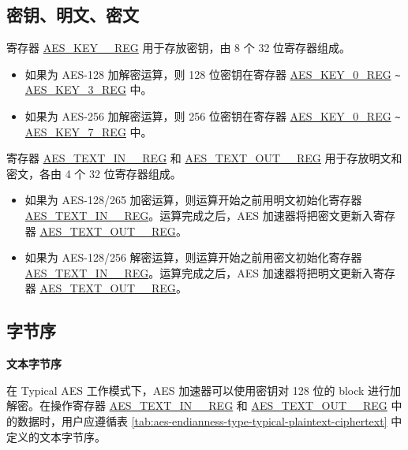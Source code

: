 \documentclass[main\_\_CN.tex]{subfiles}
\begin{document}
\subsection{密钥、明文、密文}

寄存器 \hyperref[regdesc:AESKEYnREG]{AES\_KEY\_\_REG} 用于存放密钥，由 8 个 32 位寄存器组成。

\begin{itemize}
    \item 如果为 AES-128 加解密运算，则 128 位密钥在寄存器 \hyperref[regdesc:AESKEYnREG]{AES\_KEY\_0\_REG} \verb+~+ \hyperref[regdesc:AESKEYnREG]{AES\_KEY\_3\_REG} 中。
    \item 如果为 AES-256 加解密运算，则 256 位密钥在寄存器 \hyperref[regdesc:AESKEYnREG]{AES\_KEY\_0\_REG} \verb+~+ \hyperref[regdesc:AESKEYnREG]{AES\_KEY\_7\_REG} 中。
\end{itemize}

寄存器 \hyperref[regdesc:AESTEXTINnREG]{AES\_TEXT\_IN\_\_REG} 和 \hyperref[regdesc:AESTEXTOUTnREG]{AES\_TEXT\_OUT\_\_REG} 用于存放明文和密文，各由 4 个 32 位寄存器组成。

\begin{itemize}
    \item 如果为 AES-128/265 加密运算，则运算开始之前用明文初始化寄存器 \hyperref[regdesc:AESTEXTINnREG]{AES\_TEXT\_IN\_\_REG}。运算完成之后，AES 加速器将把密文更新入寄存器 \hyperref[regdesc:AESTEXTOUTnREG]{AES\_TEXT\_OUT\_\_REG}。
    \item 如果为 AES-128/256 解密运算，则运算开始之前用密文初始化寄存器 \hyperref[regdesc:AESTEXTINnREG]{AES\_TEXT\_IN\_\_REG}。运算完成之后，AES 加速器将把明文更新入寄存器 \hyperref[regdesc:AESTEXTOUTnREG]{AES\_TEXT\_OUT\_\_REG}。
\end{itemize}

\subsection{字节序}

\textbf{文本字节序}

在 Typical AES 工作模式下，AES 加速器可以使用密钥对 128 位的 block 进行加解密。在操作寄存器 \hyperref[regdesc:AESTEXTINnREG]{AES\_TEXT\_IN\_\_REG} 和 \hyperref[regdesc:AESTEXTINnREG]{AES\_TEXT\_OUT\_\_REG} 中的数据时，用户应遵循表 \ref{tab:aes-endianness-type-typical-plaintext-ciphertext} 中定义的文本字节序。

\end{document}
